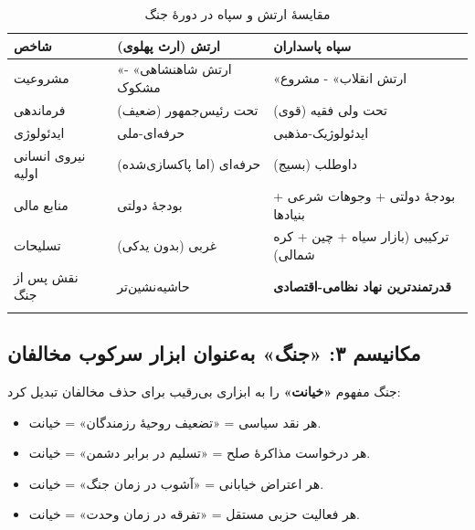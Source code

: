 \documentclass[12pt,a4paper]{book}
\newcommand{\keyword}[1]{\textbf{\textcolor{cPrimary}{#1}}}
\begin{document}
\begin{longtable}{%
    >{\raggedleft\arraybackslash}p{}
    >{\raggedleft\arraybackslash}p{}
    >{\raggedleft\arraybackslash}p{}}
\toprule
\rowcolor{cPrimary!10}
\textbf{شاخص} & \textbf{ارتش (ارث پهلوی)} & \textbf{سپاه پاسداران} \\
\midrule
\endhead

مشروعیت &
«ارتش شاهنشاهی» - مشکوک &
«ارتش انقلاب» - مشروع \\
\midrule

فرماندهی &
تحت رئیس‌جمهور (ضعیف) &
تحت ولی فقیه (قوی) \\
\midrule

ایدئولوژی &
حرفه‌ای-ملی &
ایدئولوژیک-مذهبی \\
\midrule

نیروی انسانی اولیه &
حرفه‌ای (اما پاکسازی‌شده) &
داوطلب (بسیج) \\
\midrule

منابع مالی &
بودجهٔ دولتی &
بودجهٔ دولتی + وجوهات شرعی + بنیادها \\
\midrule

تسلیحات &
غربی (بدون یدکی) &
ترکیبی (بازار سیاه + چین + کره شمالی) \\
\midrule

نقش پس از جنگ &
حاشیه‌نشین‌تر &
\keyword{قدرتمندترین نهاد نظامی-اقتصادی} \\

\bottomrule
\caption{مقایسهٔ ارتش و سپاه در دورهٔ جنگ}
\label{tab:army-vs-irgc}
\end{longtable}

\subsection{مکانیسم ۳: «جنگ» به‌عنوان ابزار سرکوب مخالفان}

جنگ مفهوم \keyword{«خیانت»} را به ابزاری بی‌رقیب برای حذف مخالفان تبدیل کرد:

\begin{warningBox}
\begin{itemize}[label=\textcolor{cAccent}{$\blacktriangleright$}, rightmargin=2em]
    \item هر نقد سیاسی = «تضعیف روحیهٔ رزمندگان» = خیانت.
    \item هر درخواست مذاکرهٔ صلح = «تسلیم در برابر دشمن» = خیانت.
    \item هر اعتراض خیابانی = «آشوب در زمان جنگ» = خیانت.
    \item هر فعالیت حزبی مستقل = «تفرقه در زمان وحدت» = خیانت.
\end{itemize}
\end{warningBox}
\end{document}
